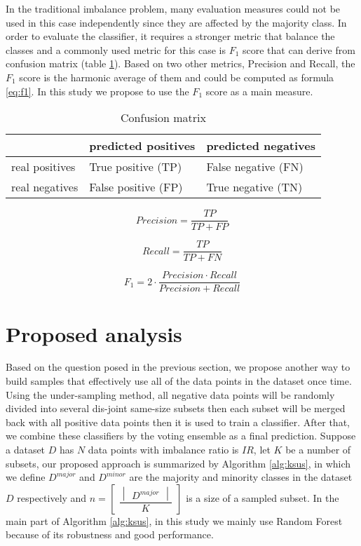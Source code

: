 In the traditional imbalance problem, many evaluation measures could not be used in this case independently since they are affected by the majority class. In order to evaluate the classifier, it requires a stronger metric that balance the classes and a commonly used metric for this case is $F_1$ score that can derive from confusion matrix (table \ref{tbl:confusion_matrix}). Based on two other metrics, Precision and Recall, the $F_1$ score is the harmonic average of them and could be computed as formula \ref{eq:f1}. In this study we propose to use the $F_1$ score as a main measure.


\begin{table}[h]
\centering
\caption{Confusion matrix}
\label{tbl:confusion_matrix}
\begin{tabular}{lll}
\hline
               & predicted positives & predicted negatives \\ \hline
real positives & True positive (TP)  & False negative (FN) \\ \hline
real negatives & False positive (FP) & True negative (TN)  \\ \hline
\end{tabular}
\end{table}

\begin{equation}
\label{eq:precision}
Precision = \dfrac{TP}{TP + FP}
\end{equation}

\begin{equation}
\label{eq:recall}
Recall = \dfrac{TP}{TP + FN}
\end{equation}

\begin{equation}
\label{eq:f1}
F_1 = 2 \cdot \dfrac{Precision \cdot Recall}{Precision + Recall}
\end{equation}


\section{Proposed analysis}


Based on the question posed in the previous section, we propose another way to build samples that effectively use all of the data points in the dataset once time. Using the under-sampling method, all negative data points will be randomly divided into several dis-joint same-size subsets then each subset will be merged back with all positive data points then it is used to train a classifier. After that, we combine these classifiers by the voting ensemble as a final prediction. Suppose a dataset $D$ has $N$ data points with imbalance ratio is $IR$, let $K$ be a number of subsets, our proposed approach is summarized by Algorithm \ref{alg:ksus}, in which we define $D^{major}$ and $D^{minor}$ are the majority and minority classes in the dataset $D$ respectively and $n = \begin{bmatrix} \dfrac{ \begin{vmatrix} D^{major} \end{vmatrix} }{ K } \end{bmatrix}$ is a size of a sampled subset. In the main part of Algorithm \ref{alg:ksus},  in this study we mainly use Random Forest because of its robustness and good performance.


